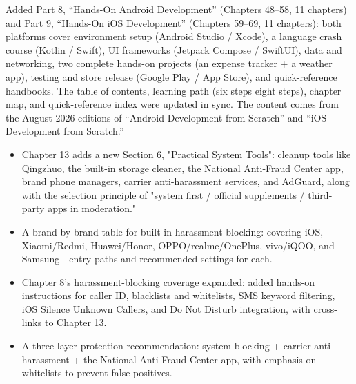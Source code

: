 Added Part 8, “Hands-On Android Development” (Chapters 48–58, 11 chapters) and Part 9, “Hands-On iOS Development” (Chapters 59–69, 11 chapters): both platforms cover environment setup (Android Studio / Xcode), a language crash course (Kotlin / Swift), UI frameworks (Jetpack Compose / SwiftUI), data and networking, two complete hands-on projects (an expense tracker + a weather app), testing and store release (Google Play / App Store), and quick-reference handbooks. The table of contents, learning path (six steps eight steps), chapter map, and quick-reference index were updated in sync. The content comes from the August 2026 editions of “Android Development from Scratch” and “iOS Development from Scratch.”


\begin{itemize}
  \item Chapter 13 adds a new Section 6, "Practical System Tools": cleanup tools like Qingzhuo, the built-in storage cleaner, the National Anti-Fraud Center app, brand phone managers, carrier anti-harassment services, and AdGuard, along with the selection principle of "system first / official supplements / third-party apps in moderation."
  \item A brand-by-brand table for built-in harassment blocking: covering iOS, Xiaomi/Redmi, Huawei/Honor, OPPO/realme/OnePlus, vivo/iQOO, and Samsung—entry paths and recommended settings for each.
  \item Chapter 8's harassment-blocking coverage expanded: added hands-on instructions for caller ID, blacklists and whitelists, SMS keyword filtering, iOS Silence Unknown Callers, and Do Not Disturb integration, with cross-links to Chapter 13.
  \item A three-layer protection recommendation: system blocking + carrier anti-harassment + the National Anti-Fraud Center app, with emphasis on whitelists to prevent false positives.
\end{itemize}


